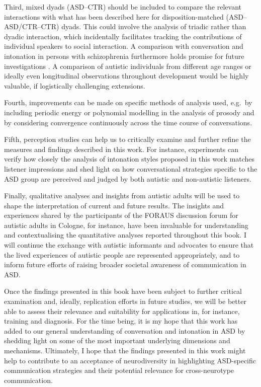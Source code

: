 Third, mixed dyads (ASD--CTR) should be included to compare the relevant interactions with what has been described here for disposition-matched (ASD--ASD/CTR--CTR) dyads. This could involve the analysis of triadic rather than dyadic interaction, which incidentally facilitates tracking the contributions of individual speakers to social interaction.  A comparison with conversation and intonation in persons with schizophrenia furthermore holds promise for future investigations \citep[cf.][]{lucariniConversationalMetricsPsychopathological2021,cangemiContentfreeSpeechActivity2023,howesDisfluenciesDialoguesPatients2017}. A comparison of autistic individuals from different age ranges or ideally even longitudinal observations throughout development would be highly valuable, if logistically challenging extensions.

\hspace*{-.9pt}Fourth, improvements can be made on specific methods of analysis used, e.g.~by including periodic energy or polynomial modelling in the analysis of prosody and by considering convergence continuously across the time course of conversations.

Fifth, perception studies can help us to critically examine and further refine the measures and findings described in this work. For instance, experiments can verify how closely the analysis of intonation styles proposed in this work matches listener impressions \citep[see a first validation in][]{wehrleEvaluatingProsodicAspects2023} and shed light on how conversational strategies specific to the ASD group are perceived and judged by both autistic and non-autistic listeners.

Finally, qualitative analyses and insights from autistic adults will be used to shape the interpretation of current and future results. The insights and experiences shared by the participants of the FORAUS discussion forum for autistic adults in Cologne, for instance, have been invaluable for understanding and contextualising the quantitative analyses reported throughout this book. I will continue the exchange with autistic informants and advocates to ensure that the lived experiences of autistic people are represented appropriately, and to inform future efforts of raising broader societal awareness of communication in ASD.

Once the findings presented in this book have been subject to further critical examination and, ideally, replication efforts in future studies, we will be better able to assess their relevance and suitability for applications in, for instance, training and diagnosis. For the time being, it is my hope that this work has added to our general understanding of conversation and intonation in ASD by shedding light on some of the most important underlying dimensions and mechanisms. Ultimately, I hope that the findings presented in this work might help to contribute to an acceptance of neurodiversity in highlighting ASD-specific communication strategies and their potential relevance for cross-neurotype communication.
